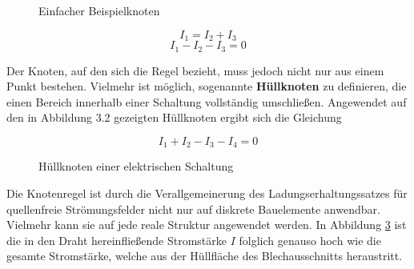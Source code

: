 \begin{frame}
{		
		\begin{figure}[h!]
			\centering
			{}
			
			{\caption{Einfacher Beispielknoten}}
			\label{fig:knoten}
		\end{figure}
		
		
		
		
		
		\begin{equation*}
			I_1 = I_2 + I_3
		\end{equation*}
		\begin{equation*}
			I_1 - I_2 - I_3 = 0
		\end{equation*}
		
		Der Knoten, auf den sich die Regel bezieht, muss jedoch nicht nur aus einem Punkt bestehen. 
		Vielmehr ist möglich, sogenannte \textbf{Hüllknoten} zu definieren, die einen Bereich 
		innerhalb einer Schaltung vollständig umschließen.
		Angewendet auf den in Abbildung 3.2
		gezeigten Hüllknoten ergibt sich die Gleichung
		
		\begin{equation*}
			I_1 + I_2 - I_3 - I_4 = 0
		\end{equation*}
		
		
		\begin{figure}[h!]
			\begin{center}
				
			\end{center}
			\label{fig:knoten2}
			\caption{Hüllknoten einer elektrischen Schaltung}
		\end{figure}
		
		Die Knotenregel ist durch die Verallgemeinerung des Ladungserhaltungssatzes für quellenfreie
		Strömungsfelder nicht nur auf diskrete Bauelemente anwendbar. Vielmehr kann sie auf jede reale
		Struktur angewendet werden. In Abbildung \ref{fig:huell} ist die in den Draht hereinfließende Stromstärke
		$I$ folglich genauso hoch wie die gesamte Stromstärke, welche aus der Hüllfläche des Blechausschnitts heraustritt.
		
		
		
		\begin{figure}[h!]
			\centering
			\s{}
			
			\label{fig:huell}
		\end{figure}
		
}
\end{frame}

